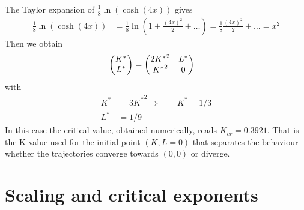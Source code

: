 The Taylor expansion of $\frac{1}{8} \ln(\cosh(4x))$ gives
%
\begin{align*}
\frac{1}{8} \ln(\cosh(4x)) &= \frac{1}{8} \ln( 1 + \frac{(4x)^{2}}{2} +\ldots  )  = \frac{1}{8} \frac{(4x)^{2}}{2} + \ldots = x^{2}
\end{align*}
%
Then we obtain
%
\begin{align*}
\mqty(K^{*}\\L^{*})
&=
\mqty(
2 {K^{*}}^{2} & L^{*}\\
{K^{*}}^{2}&0
)
\end{align*}
%
with
\begin{align*}
K^{*} &= 3 {K^{*}}^{2}\Rightarrow\qquad K^{*}=1/3\\
L^{*} &= 1/9
\end{align*}
%
In this case the critical value,  obtained numerically, reads $K_{cr} = 0.3921$. That is the K-value used for the initial point $(K,L=0)$ that separates the behaviour whether the trajectories converge towards $(0,0)$
or diverge. 

\begin{comment}

%
\begin{align*}
\mqty(\var K'\\\var L')
&=
\mqty(
4 K^{*} & 1\\
2 K^{*}&0
)
\mqty(\var K\\\var L)
=
\mqty(
\frac{4}{3} & 1\\
\frac{2}{3}&0
)
\mqty(\var K\\\var L)
\end{align*}
%

\end{comment}


 
%



\section{Scaling and critical exponents}

